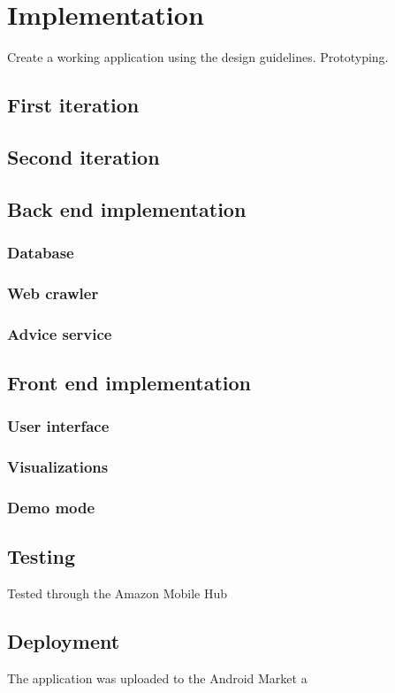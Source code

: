 \chapter{Implementation}
Create a working application using the design guidelines.
Prototyping.

\section{First iteration}




\section{Second iteration}


\section{Back end implementation}
\subsection{Database}
\subsection{Web crawler}
\subsection{Advice service}

\section{Front end implementation}
\subsection{User interface}
\subsection{Visualizations}
\subsection{Demo mode}

\section{Testing}
Tested through the Amazon Mobile Hub

\section{Deployment}
The application was uploaded to the Android Market a